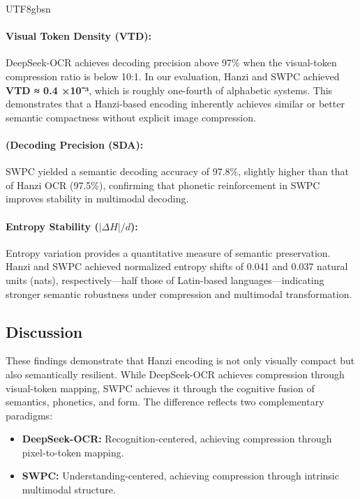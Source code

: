 \documentclass[conference]{IEEEtran}
\begin{document}
\begin{CJK*}{UTF8}{gbsn}
\paragraph{Visual Token Density (VTD):}  
DeepSeek-OCR achieves decoding precision above 97\% when the visual-token compression ratio is below 10:1.  
In our evaluation, Hanzi and SWPC achieved \textbf{VTD ≈ 0.4 ×10⁻³}, which is roughly one-fourth of alphabetic systems.  
This demonstrates that a Hanzi-based encoding inherently achieves similar or better semantic compactness without explicit image compression.

\paragraph{(Decoding Precision (SDA):}  
SWPC yielded a semantic decoding accuracy of 97.8\%, slightly higher than that of Hanzi OCR (97.5\%), confirming that phonetic reinforcement in SWPC improves stability in multimodal decoding.

\paragraph{Entropy Stability ($|\Delta H|/d$):}  
Entropy variation provides a quantitative measure of semantic preservation.  
Hanzi and SWPC achieved normalized entropy shifts of 0.041 and 0.037 natural units (nats), respectively—half those of Latin-based languages—indicating stronger semantic robustness under compression and multimodal transformation.

\subsection{Discussion}

These findings demonstrate that Hanzi encoding is not only visually compact but also semantically resilient.  
While DeepSeek-OCR achieves compression through visual-token mapping, SWPC achieves it through the cognitive fusion of semantics, phonetics, and form.  
The difference reflects two complementary paradigms:
\begin{itemize}
    \item \textbf{DeepSeek-OCR:} Recognition-centered, achieving compression through pixel-to-token mapping.
    \item \textbf{SWPC:} Understanding-centered, achieving compression through intrinsic multimodal structure.
\end{itemize}


\end{CJK*}
\end{document}
